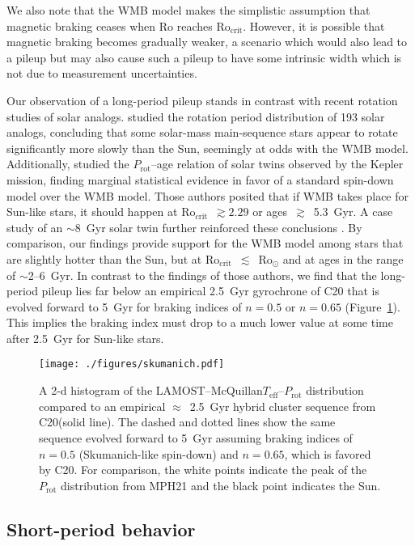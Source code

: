 \documentclass[trackchanges,twocolumn]{aastex631}
\newcommand{\rocrit}{$\mathrm{Ro_{crit}}$\xspace}
\newcommand{\rosun}{$\mathrm{Ro_{\odot}}$\xspace}
\newcommand{\lamostmcq}{LAMOST--McQuillan\xspace}
\newcommand{\masuda}{MPH21\xspace}
\newcommand{\curtis}{C20\xspace}
\newcommand{\teff}{\ensuremath{T_{\mathrm{eff}}}\xspace}
\newcommand{\prot}{\ensuremath{P_\mathrm{rot}}\xspace}
\begin{document}
We also note that the WMB model makes the simplistic assumption that magnetic braking ceases when Ro reaches \rocrit. However, it is possible that magnetic braking becomes gradually weaker, a scenario which would also lead to a pileup but may also cause such a pileup to have some intrinsic width which is not due to measurement uncertainties.

Our observation of a long-period pileup stands in contrast with recent rotation studies of solar analogs. \citet{doNascimento2020} studied the rotation period distribution of 193 solar analogs, concluding that some solar-mass main-sequence stars appear to rotate significantly more slowly than the Sun, seemingly at odds with the WMB model. Additionally, \citet{LorenzoOliveira2019} studied the \prot--age relation of solar twins observed by the Kepler mission, finding marginal statistical evidence in favor of a standard spin-down model over the WMB model. Those authors posited that if WMB takes place for Sun-like stars, it should happen at \rocrit~$\gtrsim 2.29$ or ages~$\gtrsim$~5.3~Gyr. A case study of an $\sim$8~Gyr solar twin further reinforced these conclusions \citep{LorenzoOliveira2020}.  By comparison, our findings provide support for the WMB model among stars that are slightly hotter than the Sun, but at \rocrit~$\lesssim$~\rosun and at ages in the range of $\sim$2--6~Gyr. In contrast to the findings of those authors, we find that the long-period pileup lies far below an empirical 2.5~Gyr gyrochrone of \curtis that is evolved forward to 5~Gyr for braking indices of $n=0.5$ or $n=0.65$ (Figure~\ref{fig:skumanich}). This implies the braking index must drop to a much lower value at some time after 2.5~Gyr for Sun-like stars.

\begin{figure}
    \centering
    \texttt{[image: ./figures/skumanich.pdf]}
    \caption{A 2-d histogram of the \lamostmcq \teff–\prot distribution compared to an empirical $\approx$~2.5~Gyr hybrid cluster sequence from \curtis (solid line). The dashed and dotted lines show the same sequence evolved forward to 5~Gyr assuming braking indices of $n=0.5$ (Skumanich-like spin-down) and $n=0.65$, which is favored by \curtis. For comparison, the white points indicate the peak of the \prot distribution from \masuda and the black point indicates the Sun.}
    \label{fig:skumanich}
\end{figure}

\subsection{Short-period behavior} \label{subsec:shortperiod}
\end{document}
